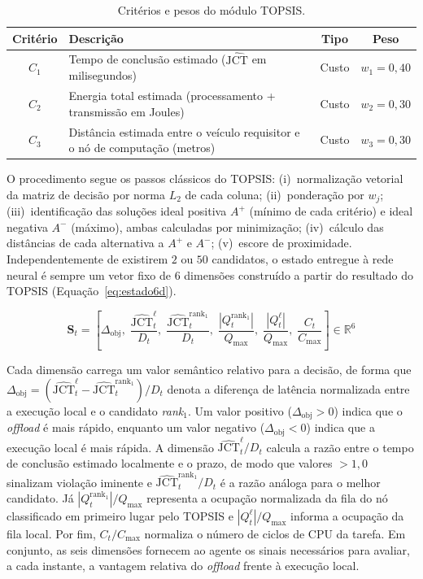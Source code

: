 \begin{table}[htb]
\centering
\caption{Critérios e pesos do módulo \gls{TOPSIS}.}
\label{tab:topsis-criterios}
\begin{tabular}{c p{8.5cm} c c}
\hline
\textbf{Critério} & \textbf{Descrição} & \textbf{Tipo} & \textbf{Peso} \\
\hline
$C_1$ & Tempo de conclusão estimado ($\widehat{\text{JCT}}$ em milisegundos) & Custo & $w_1 = 0{,}40$ \\
$C_2$ & Energia total estimada (processamento + transmissão em Joules) & Custo & $w_2 = 0{,}30$ \\
$C_3$ & Distância estimada entre o veículo requisitor e o nó de computação (metros) & Custo & $w_3 = 0{,}30$ \\
\hline
\end{tabular}
\end{table}

O procedimento segue os passos clássicos do \gls{TOPSIS}: (i)~normalização vetorial da matriz de decisão por norma $L_2$ de cada coluna; (ii)~ponderação por $w_j$; (iii)~identificação das soluções ideal positiva $A^+$ (mínimo de cada critério) e ideal negativa $A^-$ (máximo), ambas calculadas por minimização; (iv)~cálculo das distâncias de cada alternativa a $A^+$ e $A^-$; (v)~escore de proximidade. Independentemente de existirem $2$ ou $50$ candidatos, o estado entregue à rede neural é sempre um vetor fixo de 6 dimensões construído a partir do resultado do \gls{TOPSIS} (Equação~\ref{eq:estado6d}).

\begin{equation}
    \mathbf{S}_t = \left[\Delta_{\text{obj}},\; \frac{\widehat{\text{JCT}}^{\ell}_t}{D_t},\; \frac{\widehat{\text{JCT}}^{\text{rank}_1}_t}{D_t},\; \frac{|Q^{\text{rank}_1}_t|}{Q_{\max}},\; \frac{|Q^{\ell}_t|}{Q_{\max}},\; \frac{C_t}{C_{\max}}\right] \in \mathbb{R}^6
    \label{eq:estado6d}
\end{equation}

Cada dimensão carrega um valor semântico relativo para a decisão, de forma que $\Delta_{\text{obj}} = (\widehat{\text{JCT}}^{\ell}_t - \widehat{\text{JCT}}^{\text{rank}_1}_t) / D_t$ denota a diferença de latência normalizada entre a execução local e o candidato \textit{rank}$_1$. Um valor positivo ($\Delta_{\text{obj}} > 0$) indica que o \textit{offload} é mais rápido, enquanto um valor negativo ($\Delta_{\text{obj}} < 0$) indica que a execução local é mais rápida. A dimensão $\widehat{\text{JCT}}^{\ell}_t/D_t$ calcula a razão entre o tempo de conclusão estimado localmente e o prazo, de modo que valores $> 1{,}0$ sinalizam violação iminente e $\widehat{\text{JCT}}^{\text{rank}_1}_t/D_t$ é a razão análoga para o melhor candidato. Já $|Q^{\text{rank}_1}_t|/Q_{\max}$ representa a ocupação normalizada da fila do nó classificado em primeiro lugar pelo \gls{TOPSIS} e $|Q^{\ell}_t|/Q_{\max}$ informa a ocupação da fila local. Por fim, $C_t/C_{\max}$ normaliza o número de ciclos de \gls{CPU} da tarefa. Em conjunto, as seis dimensões fornecem ao agente os sinais necessários para avaliar, a cada instante, a vantagem relativa do \textit{offload} frente à execução local.

